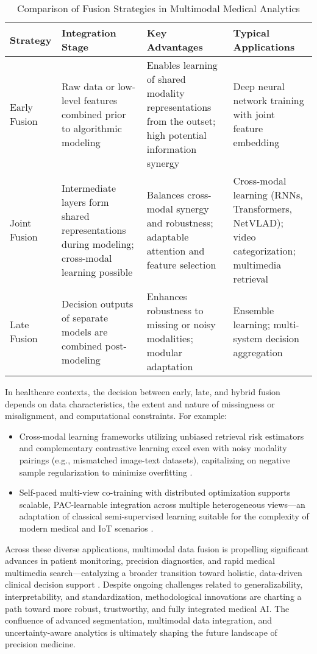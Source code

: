 \documentclass[11pt]{article}
\begin{document}
\begin{table}[h]
    \centering
    \caption{Comparison of Fusion Strategies in Multimodal Medical Analytics}
    \label{tab:fusion_strategies}
    \begin{tabular}{|l|p{3.6cm}|p{4cm}|p{4cm}|}
        \hline
        \textbf{Strategy} & \textbf{Integration Stage} & \textbf{Key Advantages} & \textbf{Typical Applications} \\
        \hline
        Early Fusion & Raw data or low-level features combined prior to algorithmic modeling & Enables learning of shared modality representations from the outset; high potential information synergy & Deep neural network training with joint feature embedding \\
        \hline
        Joint Fusion & Intermediate layers form shared representations during modeling; cross-modal learning possible & Balances cross-modal synergy and robustness; adaptable attention and feature selection & Cross-modal learning (RNNs, Transformers, NetVLAD); video categorization; multimedia retrieval \\
        \hline
        Late Fusion & Decision outputs of separate models are combined post-modeling & Enhances robustness to missing or noisy modalities; modular adaptation & Ensemble learning; multi-system decision aggregation \\
        \hline
    \end{tabular}
\end{table}

In healthcare contexts, the decision between early, late, and hybrid fusion depends on data characteristics, the extent and nature of missingness or misalignment, and computational constraints. For example:
\begin{itemize}
    \item Cross-modal learning frameworks utilizing unbiased retrieval risk estimators and complementary contrastive learning excel even with noisy modality pairings (e.g., mismatched image-text datasets), capitalizing on negative sample regularization to minimize overfitting \cite{ref64,ref61}.
    \item Self-paced multi-view co-training with distributed optimization supports scalable, PAC-learnable integration across multiple heterogeneous views—an adaptation of classical semi-supervised learning suitable for the complexity of modern medical and IoT scenarios \cite{ref54,ref60,ref62}.
\end{itemize}

Across these diverse applications, multimodal data fusion is propelling significant advances in patient monitoring, precision diagnostics, and rapid medical multimedia search—catalyzing a broader transition toward holistic, data-driven clinical decision support \cite{ref41,ref42,ref50,ref61,ref65,ref70,ref71,ref86,ref89,ref90,ref104,ref105}. Despite ongoing challenges related to generalizability, interpretability, and standardization, methodological innovations are charting a path toward more robust, trustworthy, and fully integrated medical AI. The confluence of advanced segmentation, multimodal data integration, and uncertainty-aware analytics is ultimately shaping the future landscape of precision medicine.
\end{document}
